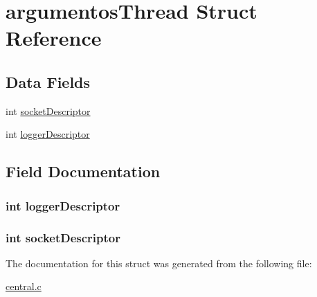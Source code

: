 \hypertarget{structargumentos_thread}{
\section{argumentosThread Struct Reference}
\label{structargumentos_thread}
}
\subsection*{Data Fields}
\begin{DoxyCompactItemize}
\item 
int \hyperlink{structargumentos_thread_a437986937a6060ee01e5357fff865bf9}{socketDescriptor}
\item 
int \hyperlink{structargumentos_thread_ae7320ba53c9958b01d156cc43310a4c9}{loggerDescriptor}
\end{DoxyCompactItemize}


\subsection{Field Documentation}
\hypertarget{structargumentos_thread_ae7320ba53c9958b01d156cc43310a4c9}{
\subsubsection[{loggerDescriptor}]{\setlength{\rightskip}{0pt plus 5cm}int {\bf loggerDescriptor}}}
\label{structargumentos_thread_ae7320ba53c9958b01d156cc43310a4c9}
\hypertarget{structargumentos_thread_a437986937a6060ee01e5357fff865bf9}{
\subsubsection[{socketDescriptor}]{\setlength{\rightskip}{0pt plus 5cm}int {\bf socketDescriptor}}}
\label{structargumentos_thread_a437986937a6060ee01e5357fff865bf9}


The documentation for this struct was generated from the following file:\begin{DoxyCompactItemize}
\item 
\hyperlink{central_8c}{central.c}\end{DoxyCompactItemize}
